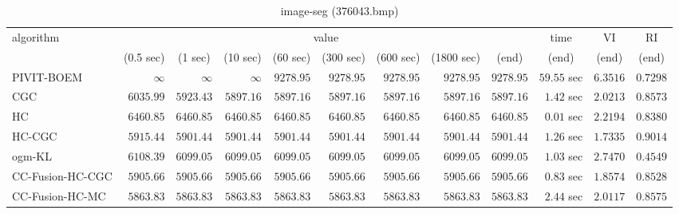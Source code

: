 \begin{table}[H]
\scriptsize
\centering
\caption{image-seg (376043.bmp)}
\label{tab:anytimetable-image-seg-376043.bmp}
\begin{tabular}{lrrrrrrrrrrr}
\toprule
           algorithm &                                   \multicolumn{8}{c}{value} & \multicolumn{1}{c}{time}    & \multicolumn{1}{c}{VI}  & \multicolumn{1}{c}{RI} \\  
\cmidrule(lr){2-9}\cmidrule(lr){10-10} \cmidrule(lr){11-11} \cmidrule(lr){12-12}   
                     & \multicolumn{1}{c}{(0.5 sec)} & \multicolumn{1}{c}{(1 sec)} & \multicolumn{1}{c}{(10 sec)} & \multicolumn{1}{c}{(60 sec)} & \multicolumn{1}{c}{(300 sec)} & \multicolumn{1}{c}{(600 sec)} & \multicolumn{1}{c}{(1800 sec)} & \multicolumn{1}{c}{(end)} & \multicolumn{1}{c}{(end)}    & \multicolumn{1}{c}{(end)}   & \multicolumn{1}{c}{(end)}  \\ \midrule 
          PIVIT-BOEM & $\infty$ & $\infty$ & $\infty$ & $      9278.95$ & $      9278.95$ & $      9278.95$ & $      9278.95$ & $      9278.95$ & $        59.55$ sec    & $       6.3516$  & $       0.7298$ \\ 
                 CGC & $      6035.99$ & $      5923.43$ & $      5897.16$ & $      5897.16$ & $      5897.16$ & $      5897.16$ & $      5897.16$ & $      5897.16$ & $         1.42$ sec    & $       2.0213$  & $       0.8573$ \\ 
                  HC & $      6460.85$ & $      6460.85$ & $      6460.85$ & $      6460.85$ & $      6460.85$ & $      6460.85$ & $      6460.85$ & $      6460.85$ & $         0.01$ sec    & $       2.2194$  & $       0.8380$ \\ 
              HC-CGC & $      5915.44$ & $      5901.44$ & $      5901.44$ & $      5901.44$ & $      5901.44$ & $      5901.44$ & $      5901.44$ & $      5901.44$ & $         1.26$ sec    & $       1.7335$  & $       0.9014$ \\ 
              ogm-KL & $      6108.39$ & $      6099.05$ & $      6099.05$ & $      6099.05$ & $      6099.05$ & $      6099.05$ & $      6099.05$ & $      6099.05$ & $         1.03$ sec    & $       2.7470$  & $       0.4549$ \\ 
    CC-Fusion-HC-CGC & $      5905.66$ & $      5905.66$ & $      5905.66$ & $      5905.66$ & $      5905.66$ & $      5905.66$ & $      5905.66$ & $      5905.66$ & $         0.83$ sec    & $       1.8574$  & $       0.8528$ \\ 
     CC-Fusion-HC-MC & $      5863.83$ & $      5863.83$ & $      5863.83$ & $      5863.83$ & $      5863.83$ & $      5863.83$ & $      5863.83$ & $      5863.83$ & $         2.44$ sec    & $       2.0117$  & $       0.8575$ \\ 

\end{tabular}
\end{table}
